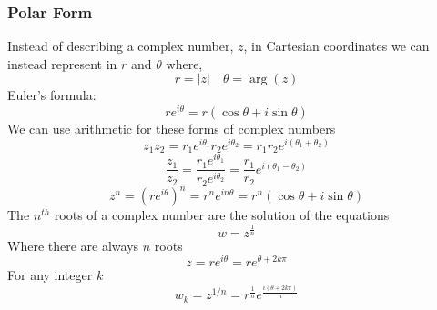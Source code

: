\documentclass[11pt,titlepage]{article}
\numberwithin{equation}{section}
\begin{document}
\subsubsection{Polar Form}
Instead of describing a complex number, $z$, in Cartesian coordinates we can instead represent in $r$ and $\theta$ where,
\begin{equation}
    r=|z| \quad \theta=\arg(z)
\end{equation}
Euler's formula:
\begin{equation}
    re^{i\theta}=r(\cos \theta+i\sin \theta)
\end{equation}
We can use arithmetic for these forms of complex numbers
\begin{equation}
    z_{1}z_{2}=r_{1}e^{i\theta_{1}}r_{2}e^{i\theta_{2}}=r_{1}r_{2}e^{i(\theta_{1}+\theta_{2})}
\end{equation}
\begin{equation}
    \frac{z_{1}}{z_{2}}=\frac{r_{1}e^{i\theta_{1}}}{r_{2}e^{i\theta_{2}}}=\frac{r_{1}}{r_{2}}e^{i(\theta_{1}-\theta_{2})}
\end{equation}
\begin{equation}
    z^n=(re^{i\theta})^n=r^ne^{in\theta}=r^n(\cos \theta +i\sin \theta)
\end{equation}
The $n^{th}$ roots of a complex number are the solution of the equations 
\begin{equation}
    w=z^{\frac{1}{n}}
\end{equation}
Where there are always $n$ roots
\begin{equation}
    z=re^{i \theta}=re^{\theta+2k\pi} 
\end{equation}
For any integer $k$
\begin{equation}
    w_{k}=z^{1/n}=r^{\frac{1}{n}}e^{\frac{i(\theta+2k\pi)}{n}}
\end{equation}
\end{document}
